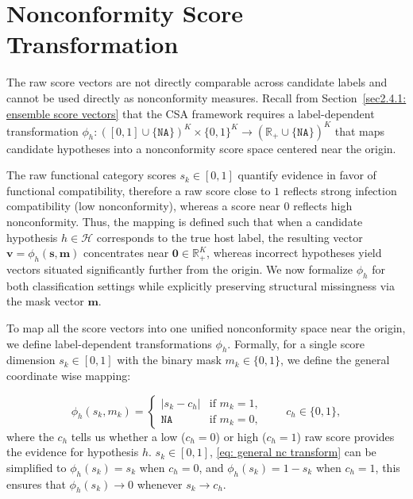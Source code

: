 
\section{Nonconformity Score Transformation}
\label{sec3.3: nc transformation}
The raw score vectors are not directly comparable across candidate labels and cannot be used directly as nonconformity 
measures. Recall from Section~\ref{sec2.4.1: ensemble score vectors} that the CSA framework requires a label-dependent 
transformation $\phi_h: ([0,1] \cup \{\texttt{NA}\})^K \times \{0,1\}^K \to \left(\mathbb{R}_+ \cup \{\texttt{NA}\}\right)^K$ 
that maps candidate hypotheses into a  nonconformity score space centered near the origin. 

The raw functional category scores $s_k \in [0, 1]$ quantify evidence in favor of functional compatibility, therefore a raw 
score close to $1$ reflects strong infection compatibility (low nonconformity), whereas a score near $0$ reflects high 
nonconformity. Thus, the mapping is defined such that when a candidate hypothesis $h \in \mathcal{H}$ corresponds to the true 
host label, the resulting vector $\mathbf{v} = \phi_h(\mathbf{s}, \mathbf{m})$ concentrates near $\mathbf{0} 
\in \mathbb{R}_+^K$, whereas incorrect hypotheses yield vectors situated significantly further from the origin. We now 
formalize $\phi_h$ for both classification settings while explicitly preserving structural missingness via the 
mask vector $\mathbf{m}$.

To map all the score vectors into one unified nonconformity space near the origin, we define label-dependent 
transformations $\phi_h$. Formally, for a single score dimension $s_k \in [0,1]$ with the binary mask $m_k \in \{0,1\}$, 
we define the general coordinate wise mapping:

\begin{equation}
\label{eq: general nc transform}
\phi_h(s_k, m_k) = 
\begin{cases} 
|s_k - c_h| & \text{if } m_k = 1, \\
\texttt{NA} & \text{if } m_k = 0,
\end{cases}
\qquad c_h \in \{0, 1\},
\end{equation}
where the $c_h$ tells us whether a low ($c_h = 0$) or high ($c_h = 1$) raw score provides the evidence for hypothesis $h$. 
$s_k \in [0,1]$, \eqref{eq: general nc transform} can be simplified to $\phi_h(s_k) = s_k$ when $c_h = 0$, and 
$\phi_h(s_k) = 1 - s_k$ when $c_h = 1$, this ensures that $\phi_h(s_k) \to 0$ whenever $s_k \to c_h$.

